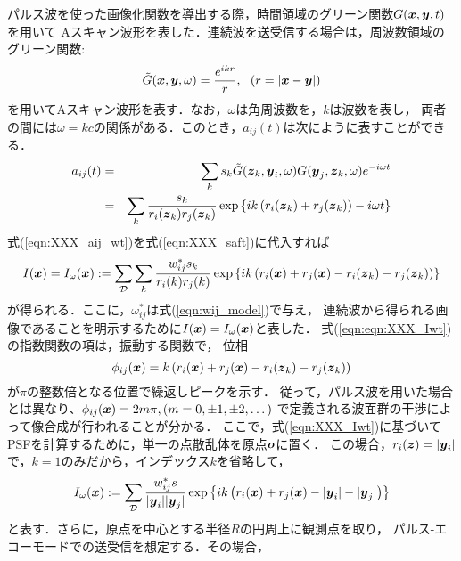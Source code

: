 パルス波を使った画像化関数を導出する際，時間領域のグリーン関数$G(\mbox{\boldmath $x$},\mbox{\boldmath $y$},t)$を用いて
Aスキャン波形を表した．連続波を送受信する場合は，周波数領域のグリーン関数:
\begin{equation}
	\tilde G(\mbox{\boldmath $x$},\mbox{\boldmath $y$},\omega)
	=
	\frac{e^{ikr}}{r}, \ \ (r=\left| \mbox{\boldmath $x$}-\mbox{\boldmath $y$} \right|)
	\label{eqn:}
\end{equation}
を用いてAスキャン波形を表す．なお，$\omega$は角周波数を，$k$は波数を表し，
両者の間には$\omega=kc$の関係がある．このとき，$a_{ij}(t)$は次にように表すことができる．
\begin{eqnarray}
	a_{ij}(t)
	&=&
	\sum_k 
	s_k \tilde G(\mbox{\boldmath $z$}_k,\mbox{\boldmath $y$}_i,\omega)G(\mbox{\boldmath $y$}_j,\mbox{\boldmath $z$}_k,\omega)e^{-i\omega t} \\
	&=&
	\sum_k \frac{s_k}{r_i(\mbox{\boldmath $z$}_k)r_j(\mbox{\boldmath $z$}_k)}
	\exp\left\{
		ik\left( 
			r_i(\mbox{\boldmath $z$}_k)+r_j(\mbox{\boldmath $z$}_k)
		\right)
		-i\omega t
	\right\}
	\label{eqn:XXX_aij_wt}
\end{eqnarray}
式(\ref{eqn:XXX_aij_wt})を式(\ref{eqn:XXX_saft})に代入すれば
\begin{equation}
	I(\mbox{\boldmath $x$})
		=
	I_\omega(\mbox{\boldmath $x$})
		:=
	\sum_{\cal D} \sum_{k}
	\frac{w_{ij}^*s_k}{r_i(k)r_j(k)} 
	\exp \left\{ 
	ik
	\left(
		r_i(\mbox{\boldmath $x$})+r_j(\mbox{\boldmath $x$})-r_i(\mbox{\boldmath $z$}_k)-r_j(\mbox{\boldmath $z$}_k)
	\right)
	\right\} 
	\label{eqn:XXX_Iwt}
\end{equation}
が得られる．ここに，$\omega_{ij}^*$は式(\ref{eqn:wij_model})で与え，
連続波から得られる画像であることを明示するために$I(\mbox{\boldmath $x$})=I_\omega(\mbox{\boldmath $x$})$と表した．
式(\ref{eqn:eqn:XXX_Iwt})の指数関数の項は，振動する関数で，
位相
\begin{equation}
	\phi_{ij}(\mbox{\boldmath $x$})=k 
	\left(
		r_i(\mbox{\boldmath $x$})+r_j(\mbox{\boldmath $x$})-r_i(\mbox{\boldmath $z$}_k)-r_j(\mbox{\boldmath $z$}_k)
	\right)
	\label{eqn:}
\end{equation}
が$\pi$の整数倍となる位置で繰返しピークを示す．
従って，パルス波を用いた場合とは異なり、$\phi_{ij}(\mbox{\boldmath $x$})=2m\pi, (m=0,\pm 1, \pm 2,\dots)$
で定義される波面群の干渉によって像合成が行われることが分かる．
ここで，式(\ref{eqn:XXX_Iwt})に基づいてPSFを計算するために，単一の点散乱体を原点$\mbox{\boldmath $o$}$に置く．
この場合，$r_i(\mbox{\boldmath $z$})=|\mbox{\boldmath $y$}_i|$で，$k=1$のみだから，インデックス$k$を省略して，
\begin{equation}
	I_\omega(\mbox{\boldmath $x$})
		:=
	\sum_{\cal D} 
	\frac{w_{ij}^*s}{|\mbox{\boldmath $y$}_i||\mbox{\boldmath $y$}_j|} 
	\exp \left\{ 
	ik
	\left(
		r_i(\mbox{\boldmath $x$})+r_j(\mbox{\boldmath $x$})-|\mbox{\boldmath $y$}_i|-|\mbox{\boldmath $y$}_j|
	\right)
	\right\}
	\label{eqn:}
\end{equation}
と表す．さらに，原点を中心とする半径$R$の円周上に観測点を取り，
パルス-エコーモードでの送受信を想定する．その場合，
